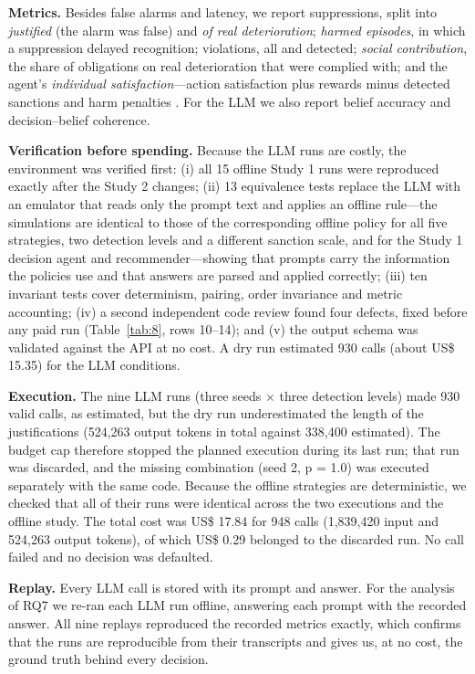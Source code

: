 \documentclass{ieeeaccess}
\begin{document}
\textbf{Metrics.} Besides false alarms and latency, we report suppressions, split into \emph{justified} (the alarm was false) and \emph{of real deterioration}; \emph{harmed episodes}, in which a suppression delayed recognition; violations, all and detected; \emph{social contribution}, the share of obligations on real deterioration that were complied with; and the agent's \emph{individual satisfaction}—action satisfaction plus rewards minus detected sanctions and harm penalties \cite{viana2015jsan}. For the LLM we also report belief accuracy and decision–belief coherence.

\textbf{Verification before spending.} Because the LLM runs are costly, the environment was verified first: (i) all 15 offline Study 1 runs were reproduced exactly after the Study 2 changes; (ii) 13 equivalence tests replace the LLM with an emulator that reads only the prompt text and applies an offline rule—the simulations are identical to those of the corresponding offline policy for all five strategies, two detection levels and a different sanction scale, and for the Study 1 decision agent and recommender—showing that prompts carry the information the policies use and that answers are parsed and applied correctly; (iii) ten invariant tests cover determinism, pairing, order invariance and metric accounting; (iv) a second independent code review found four defects, fixed before any paid run (Table~\ref{tab:8}, rows 10–14); and (v) the output schema was validated against the API at no cost. A dry run estimated 930 calls (about US\$ 15.35) for the LLM conditions.

\textbf{Execution.} The nine LLM runs (three seeds $\times$ three detection levels) made 930 valid calls, as estimated, but the dry run underestimated the length of the justifications (524,263 output tokens in total against 338,400 estimated). The budget cap therefore stopped the planned execution during its last run; that run was discarded, and the missing combination (seed 2, p = 1.0) was executed separately with the same code. Because the offline strategies are deterministic, we checked that all of their runs were identical across the two executions and the offline study. The total cost was US\$ 17.84 for 948 calls (1,839,420 input and 524,263 output tokens), of which US\$ 0.29 belonged to the discarded run. No call failed and no decision was defaulted.

\textbf{Replay.} Every LLM call is stored with its prompt and answer. For the analysis of RQ7 we re-ran each LLM run offline, answering each prompt with the recorded answer. All nine replays reproduced the recorded metrics exactly, which confirms that the runs are reproducible from their transcripts and gives us, at no cost, the ground truth behind every decision.
\end{document}
